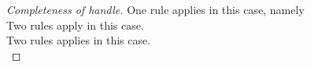 \begin{proof}[Completeness of handle]
    {
    One rule applies in this case, namely \\
    }
    {
    Two rules apply in this case.\\
      {
      }
      {
      }
    }
      {
      Two rules applies in this case.\\
      {
}}
\end{proof}
